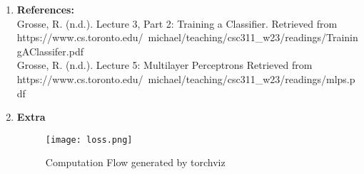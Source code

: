 \documentclass{article}
\begin{document}
\begin{enumerate}
\begin{enumerate}
\begin{enumerate}
    \end{enumerate}
\end{enumerate}
\item \textbf{References:} \\
Grosse, R. (n.d.). Lecture 3, Part 2: Training a Classifier. Retrieved from \\ https://www.cs.toronto.edu/~michael/teaching/csc311\_w23/readings/TrainingAClassifer.pdf \\

Grosse, R. (n.d.). Lecture 5: Multilayer Perceptrons Retrieved from \\ https://www.cs.toronto.edu/~michael/teaching/csc311\_w23/readings/mlps.pdf

\item \textbf{Extra}
   \begin{figure}[ht!]
                \centering
                \texttt{[image: loss.png]}
                \caption{Computation Flow generated by torchviz}
                \label{f:figure 2}
            \end{figure}
\end{enumerate}
\end{document}
